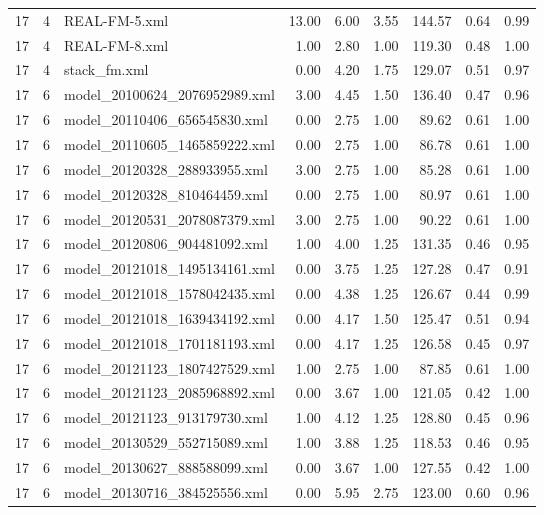 \begin{table}[ht]
\begin{tabular}{rrlrrrrrr}
   17 &   4 & REAL-FM-5.xml & 13.00 & 6.00 & 3.55 & 144.57 & 0.64 & 0.99 \\ 
   17 &   4 & REAL-FM-8.xml & 1.00 & 2.80 & 1.00 & 119.30 & 0.48 & 1.00 \\ 
   17 &   4 & stack\_fm.xml & 0.00 & 4.20 & 1.75 & 129.07 & 0.51 & 0.97 \\ 
   17 &   6 & model\_20100624\_2076952989.xml & 3.00 & 4.45 & 1.50 & 136.40 & 0.47 & 0.96 \\ 
   17 &   6 & model\_20110406\_656545830.xml & 0.00 & 2.75 & 1.00 & 89.62 & 0.61 & 1.00 \\ 
   17 &   6 & model\_20110605\_1465859222.xml & 0.00 & 2.75 & 1.00 & 86.78 & 0.61 & 1.00 \\ 
   17 &   6 & model\_20120328\_288933955.xml & 3.00 & 2.75 & 1.00 & 85.28 & 0.61 & 1.00 \\ 
   17 &   6 & model\_20120328\_810464459.xml & 0.00 & 2.75 & 1.00 & 80.97 & 0.61 & 1.00 \\ 
   17 &   6 & model\_20120531\_2078087379.xml & 3.00 & 2.75 & 1.00 & 90.22 & 0.61 & 1.00 \\ 
   17 &   6 & model\_20120806\_904481092.xml & 1.00 & 4.00 & 1.25 & 131.35 & 0.46 & 0.95 \\ 
   17 &   6 & model\_20121018\_1495134161.xml & 0.00 & 3.75 & 1.25 & 127.28 & 0.47 & 0.91 \\ 
   17 &   6 & model\_20121018\_1578042435.xml & 0.00 & 4.38 & 1.25 & 126.67 & 0.44 & 0.99 \\ 
   17 &   6 & model\_20121018\_1639434192.xml & 0.00 & 4.17 & 1.50 & 125.47 & 0.51 & 0.94 \\ 
   17 &   6 & model\_20121018\_1701181193.xml & 0.00 & 4.17 & 1.25 & 126.58 & 0.45 & 0.97 \\ 
   17 &   6 & model\_20121123\_1807427529.xml & 1.00 & 2.75 & 1.00 & 87.85 & 0.61 & 1.00 \\ 
   17 &   6 & model\_20121123\_2085968892.xml & 0.00 & 3.67 & 1.00 & 121.05 & 0.42 & 1.00 \\ 
   17 &   6 & model\_20121123\_913179730.xml & 1.00 & 4.12 & 1.25 & 128.80 & 0.45 & 0.96 \\ 
   17 &   6 & model\_20130529\_552715089.xml & 1.00 & 3.88 & 1.25 & 118.53 & 0.46 & 0.95 \\ 
   17 &   6 & model\_20130627\_888588099.xml & 0.00 & 3.67 & 1.00 & 127.55 & 0.42 & 1.00 \\ 
   17 &   6 & model\_20130716\_384525556.xml & 0.00 & 5.95 & 2.75 & 123.00 & 0.60 & 0.96 \\ 

\end{tabular}
\end{table}
